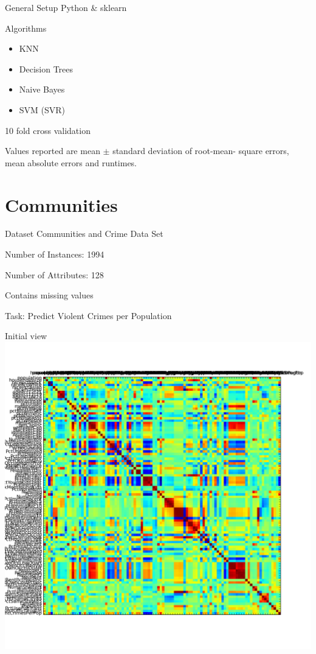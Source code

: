 \documentclass[12pt]{beamer}
\author{Martin Dobiasch \& Eugen Havasi \& Peter Rjabcsenko}
\begin{document}
\begin{frame}
\titlepage
\end{frame}


\begin{frame}{General Setup}
Python \& sklearn

\begin{block}{Algorithms}
\begin{itemize}
\item KNN
\item Decision Trees
\item Naive Bayes
\item SVM (SVR)
\end{itemize}
\end{block}

10 fold cross validation

Values reported are mean $\pm$ standard deviation of root-mean-
square errors, mean absolute errors and runtimes.

\end{frame}

\section{Communities}
\begin{frame}{Dataset}
Communities and Crime Data Set

Number of Instances: 1994

Number of Attributes: 128

Contains missing values

Task: Predict Violent Crimes per Population
\end{frame}

\begin{frame}{Initial view}
\includegraphics[height=\textheight,width=\textwidth,keepaspectratio]{plots/communities_orig.png}
\end{frame}
\end{document}
